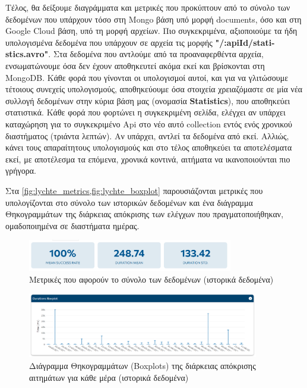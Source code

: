 Tέλος, θα δείξουμε διαγράμματα και μετρικές που προκύπτουν από το σύνολο των δεδομένων που υπάρχουν
τόσο στη Mongo βάση υπό μορφή documents, όσο και στη Google Cloud βάση, υπό τη μορφή αρχείων. Πιο συγκεκριμένα, αξιοποιούμε
τα ήδη υπολογισμένα δεδομένα που υπάρχουν σε αρχεία τις μορφής \textbf{"/:apiId/stati\hyp{}stics.avro"}. Στα
δεδομένα που αντλούμε από τα προαναφερθέντα αρχεία, ενσωματώνουμε όσα δεν έχουν αποθηκευτεί ακόμα εκεί και βρίσκονται
στη MongoDB. Κάθε φορά που γίνονται οι υπολογισμοί αυτοί, και για να γλιτώσουμε τέτοιους συνεχείς
υπολογισμούς, αποθηκεύουμε όσα στοιχεία χρειαζόμαστε σε μία νέα συλλογή δεδομένων στην κύρια βάση μας (ονομασία \textbf{Statistics}), που αποθηκεύει
στατιστικά. Κάθε φορά που φορτώνει η συγκεκριμένη σελίδα, ελέγχει αν υπάρχει καταχώρηση για το συγκεκριμένο Api στο νέο αυτό collection εντός
ενός χρονικού διαστήματος (τριάντα λεπτών). Αν υπάρχει, αντλεί τα δεδομένα από εκεί. Αλλιώς, κάνει τους απαραίτητους υπολογισμούς και στο τέλος
αποθηκεύει τα αποτελέσματα εκεί, με αποτέλεσμα τα επόμενα, χρονικά κοντινά, αιτήματα να ικανοποιούνται πιο γρήγορα.

Στα \cref{fig:lychte_metrics,fig:lychte_boxplot} παρουσιάζονται μετρικές που υπολογίζονται στο σύνολο των ιστορικών δεδομένων
και ένα διάγραμμα Θηκογραμμάτων της διάρκειας απόκρισης των ελέγχων που πραγματοποιήθηκαν, ομαδοποιημένα σε διαστήματα ημέρας.   

\begin{figure}[!ht]
	\centering
	\includegraphics[width=0.8\textwidth]{./images/chapter5/metrics.png}
	\caption[Μετρικές που αφορούν το σύνολο των δεδομένων (ιστορικά δεδομένα)]{Μετρικές που αφορούν το σύνολο των δεδομένων (ιστορικά δεδομένα)}
	\label{fig:lychte_metrics}
\end{figure}

\begin{figure}[!ht]
	\centering
	\includegraphics[width=0.9\textwidth]{./images/chapter5/duration_boxplot_diagram.png}
	\caption[Διάγραμμα Θηκογραμμάτων (Boxplots) της διάρκειας απόκρισης αιτημάτων για κάθε μέρα (ιστορικά δεδομένα)]{Διάγραμμα Θηκογραμμάτων (Boxplots) της διάρκειας απόκρισης αιτημάτων για κάθε μέρα (ιστορικά δεδομένα)}
	\label{fig:lychte_boxplot}
\end{figure}
